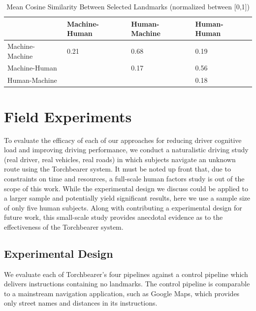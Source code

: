 \begin{table}[htbp]
  \centering
  \caption{Mean Cosine Similarity Between Selected Landmarks (normalized between [0,1])}
  \label{tab:descriptionsimilarity}
  {\tabulinesep=2mm
    \begin{singlespace}
    \begin{tabu} to \textwidth{|X[c]||X[c]|X[c]|X[c]|}
    \hline
                & Machine-Human & Human-Machine & Human-Human \\
                \hline\hline
Machine-Machine & 0.21 & 0.68 & 0.19 \\
    \hline
Machine-Human   &      & 0.17 & 0.56 \\
    \hline
Human-Machine   &      &      & 0.18
\\
    \hline
    \end{tabu}
    \end{singlespace}
    }
\end{table}

\fi

\section{Field Experiments}

To evaluate the efficacy of each of our approaches for reducing driver cognitive load and improving driving performance, we conduct a naturalistic driving study (real driver, real vehicles, real roads) in which subjects navigate an unknown route using the Torchbearer system. It must be noted up front that, due to constraints on time and resources, a full-scale human factors study is out of the scope of this work. While the experimental design we discuss could be applied to a larger sample and potentially yield significant results, here we use a sample size of only five human subjects. Along with contributing a experimental design for future work, this small-scale study provides anecdotal evidence as to the effectiveness of the Torchbearer system.

\subsection{Experimental Design}

We evaluate each of Torchbearer's four pipelines against a control pipeline which delivers instructions containing no landmarks. The control pipeline is comparable to a mainstream navigation application, such as Google Maps, which provides only street names and distances in its instructions.

